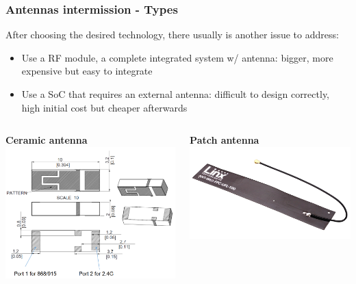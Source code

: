 \documentclass[11pt,xcolor=table,aspectratio=169]{beamer}
\begin{document}
	\begin{frame}
		\frametitle{Antennas intermission - Types}
		After choosing the desired technology, there usually is another issue to address:
		\begin{itemize}
			\item Use a RF module, a complete integrated system w/ antenna: bigger, more expensive but easy to integrate
			\item Use a SoC that requires an external antenna: difficult to design correctly, high initial cost but cheaper afterwards
		\end{itemize}
		\begin{columns}[T]
			\begin{column}{.25\textwidth}
				\centering\textbf{Ceramic antenna}\\
				\begin{adjustbox}{max height=.3\textheight,max width=.9\textwidth}
					\includegraphics{media/ceramic_ant.PNG}
				\end{adjustbox}
			\end{column}
			\begin{column}{.25\textwidth}
				\centering\textbf{Patch antenna}\\
				\begin{adjustbox}{max height=.3\textheight,max width=.9\textwidth}
					\includegraphics{media/patch_ant.PNG}

\end{adjustbox}
\end{column}
\end{columns}
\end{frame}
\end{document}
